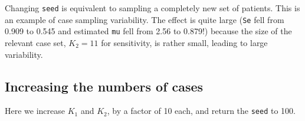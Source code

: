 \documentclass[
]{book}
\newenvironment{Shaded}{\begin{snugshade}}{\end{snugshade}}
\newcommand{\CommentTok}[1]{\textcolor[rgb]{0.56,0.35,0.01}{\textit{#1}}}
\newcommand{\DecValTok}[1]{\textcolor[rgb]{0.00,0.00,0.81}{#1}}
\newcommand{\FunctionTok}[1]{\textcolor[rgb]{0.00,0.00,0.00}{#1}}
\newcommand{\NormalTok}[1]{#1}
\newcommand{\OtherTok}[1]{\textcolor[rgb]{0.56,0.35,0.01}{#1}}
\newcommand{\SpecialCharTok}[1]{\textcolor[rgb]{0.00,0.00,0.00}{#1}}
\newcommand{\StringTok}[1]{\textcolor[rgb]{0.31,0.60,0.02}{#1}}
\begin{document}
\begin{Shaded}
\end{Shaded}

Changing \texttt{seed} is equivalent to sampling a completely new set of patients. This is an example of case sampling variability. The effect is quite large (\texttt{Se} fell from 0.909 to 0.545 and estimated \texttt{mu} fell from 2.56 to 0.879!) because the size of the relevant case set, \(K_2=11\) for sensitivity, is rather small, leading to large variability.

\hypertarget{increasing-the-numbers-of-cases}{%
\subsection{Increasing the numbers of cases}\label{increasing-the-numbers-of-cases}}

Here we increase \(K_1\) and \(K_2\), by a factor of 10 each, and return the \texttt{seed} to 100.
\end{document}
